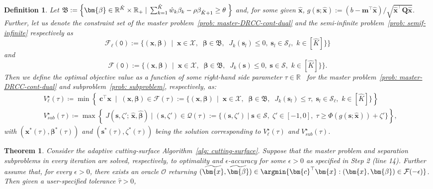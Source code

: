 \documentclass[opre,sglanonrev]{informs4}
\newtheorem{theorem}{Theorem}
\newtheorem{definition}{Definition}
\newcommand{\mF}{\mathcal{F}}
\newcommand{\mS}{\mathcal{S}}
\newcommand{\mQ}{\mathcal Q}
\newcommand{\mX}{\mathcal{X}}
\newcommand{\mfB}{\mathfrak{B}}
\newcommand{\mbR}{\mathbb R}
\newcommand{\bbeta}{\bm{\beta}}
\newcommand{\bmean}{\bm{m}}
\newcommand{\bc}{\bm{c}}
\newcommand{\bs}{\bm{s}}
\newcommand{\bx}{\bm{x}}
\newcommand{\bQ}{\bm Q}
\begin{document}
{\begin{definition}\label{def: accurate-sol}
    Let $\mfB := \Bigl\{ \bbeta \in \mbR^{\hat{K}} \times \mbR_+ \; | \;\sum_{k=1}^{\hat{K}} \hat{w}_k\beta_k - \rho \beta_{\hat{K}+1} \geq \theta \; \Bigr\}$ and, for some given $\hat{\bx}$, $g(\bs; \hat{\bx}) := (b-\bmean^\top \hat{\bx})/\sqrt{{\hat{\bx}}^\top \bQ \hat{\bx}}$. Further, let us denote the constraint set of the master problem~\eqref{prob: master-DRCC-cont-dual} and the semi-infinite problem~\eqref{prob: semif-infinite} respectively as\vspace{-0.25em} 
    \[
    \mF_\ell(\mathtt{0}) := \{ (\bx, \bbeta) \; \, | \; \; \bx \in \mX, \;\; \bbeta \in \mfB, \;\; J_k(\bs_l)\le 0,\;\bs_l \in \mS_\ell, \,\, k \in [\hat{K}]\}\bigr\}
    \]
    and\vspace{-1.8em}   
    \[
    \mF(\mathtt{0}) := \{ (\bx, \bbeta) \; \, | \; \; \bx \in \mX, \;\; \bbeta \in \mfB, \;\; J_k(\bs)\le 0,\;\bs \in \mS, \,\, k \in [\hat{K}]\}\bigr\}.
    \] 
    Then we define the optimal objective value as a function of some right-hand side parameter $\tau \in \mbR$ \, for the master problem~\eqref{prob: master-DRCC-cont-dual} and subproblem~\eqref{prob: subproblem}, respectively, as:
    \begin{align*}
    & V^\star_\ell(\tau) \coloneqq \min \left\{\; \bc^\top \bx \;\; |\;\; (\bx, \bbeta) \in  \mF(\tau) := \bigl\{ (\bx, \bbeta) \; \, | \; \; \bx \in \mX, \;\; \bbeta \in \mfB, \;\; J_k(\bs_l)\le \tau,\;\bs_l \in \mS_\ell, \,\, k \in [\hat{K}] \bigr\}\right\}  \\ 
    & V^\star_{sub}(\tau) \coloneqq \max \left\{ \; J(\bs, \zeta'; \, \hat{\bx}, \hat{\bbeta}) \; | \; (\bs, \zeta') \in  \mQ(\tau) := \bigl\{(\bs, \zeta') \; | \; \bs \in \mS, \;\zeta' \in [-1, 0], \; \tau \geq \Phi(g(\bs; \hat{\bx})) + \zeta' \bigr\}\right\}, 
    \end{align*}
    with $(\bx^*(\mathtt{\tau}), \bbeta^*(\mathtt{\tau}))$ and $(\bs^*(\mathtt{\tau}), \zeta^*(\tau))$ being the solution corresponding to $V^\star_\ell(\tau)$ and $V^\star_{sub}(\tau)$.
\end{definition}

\begin{theorem}\label{thm: Cut-S-finite-convergence}
Consider the adaptive cutting-surface Algorithm~\ref{alg: cutting-surface}.
Suppose that the master problem and separation subproblems in every iteration are solved, respectively, to optimality and $\epsilon$-accuracy for some $\epsilon > 0$ as specified in Step 2 (line 14). Further assume that, for every
\(\epsilon>0\), there exists an oracle \(\mathcal O\) returning $(\widetilde{\bx},\widetilde{\bbeta}) \in \argmin\{\bc^\top\bx:(\bx,\bbeta)\in\mF(-\epsilon)\}$.  Then given a user-specified tolerance $\hat{\tau} > 0$,


\end{theorem}}
\end{document}
